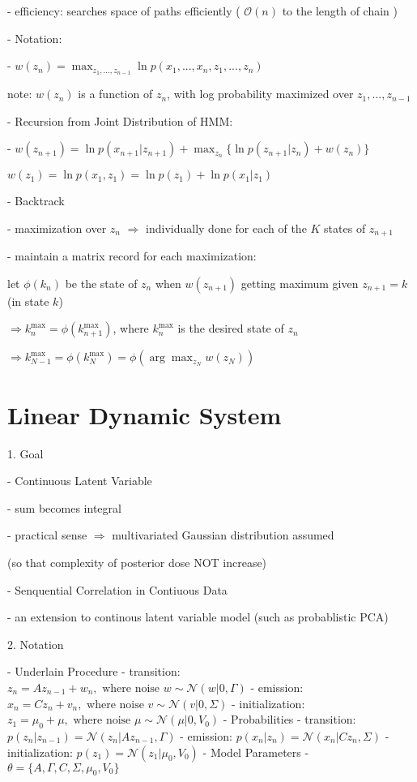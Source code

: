      - efficiency: searches space of paths efficiently ( $\mathcal O(n)$ to the length of chain )

   - Notation:

     - $\displaystyle w(z_n) = \max_{z_1,...,z_{n-1}} \ln p(x_1,...,x_n,z_1,...,z_n)$ 

       note: $w(z_n)$ is a function of $z_n$, with log probability maximized over $z_1,...,z_{n-1}$ 

   - Recursion from Joint Distribution of HMM:

     - $\displaystyle  w(z_{n+1}) = \ln p(x_{n+1}|z_{n+1}) + \max _{z_{n}} \{ \ln p(z_{n+1}|z_{n}) + w(z_{n}) \}$  

       $\displaystyle w(z_1) =\ln p(x_1,z_1) = \ln p(z_1) + \ln p(x_1|z_1) $ 

   - Backtrack

     - maximization over $z_n$ $\Rightarrow$ individually done for each of the $K$ states of $z_{n+1}$

     - maintain a matrix record for each maximization:

       let $\phi(k_n)$ be the state of $z_n$ when $w(z_{n+1})$ getting maximum given $z_{n+1} = k$ (in state $k$) 

       $\Rightarrow k_n^\text{max} = \phi(k_{n+1}^\text{max})$, where $k_n^\text{max}$ is the desired state of $z_n$

       $\displaystyle \Rightarrow k_{N-1}^\text{max} = \phi(k_{N}^\text{max})=\phi(\arg\max_{z_{N}}w(z_{N}))$   

\section{Linear Dynamic System}

1. Goal

   - Continuous Latent Variable

     - sum becomes integral

     - practical sense $\Rightarrow$ multivariated Gaussian distribution assumed

       (so that complexity of posterior dose NOT increase)

   - Senquential Correlation in Contiuous Data

     - an extension to continous latent variable model (such as probablistic PCA)

2. Notation

   - Underlain Procedure
     - transition: $z_n = A z_{n-1} + w_n, \text{ where noise } w \sim \mathcal N(w|0,\Gamma)$ 
     - emission: $x_n = Cz_n + v_n, \text{ where noise } v \sim \mathcal N(v|0,\Sigma)$
     - initialization: $z_1 = \mu_0 + \mu, \text{ where noise } \mu \sim \mathcal N (\mu|0,V_0)$ 
   - Probabilities
     - transition: $p(z_n|z_{n-1}) = \mathcal N (z_n|Az_{n-1}, \Gamma)$   
     - emission: $p(x_n|z_n) = \mathcal N (x_n|C z_n,\Sigma)$ 
     - initialization: $p(z_1) = \mathcal N(z_1|\mu_0,V_0)$  
   - Model Parameters
     - $\theta = \{ A,\Gamma,C,\Sigma,\mu_0,V_0 \}$ 

